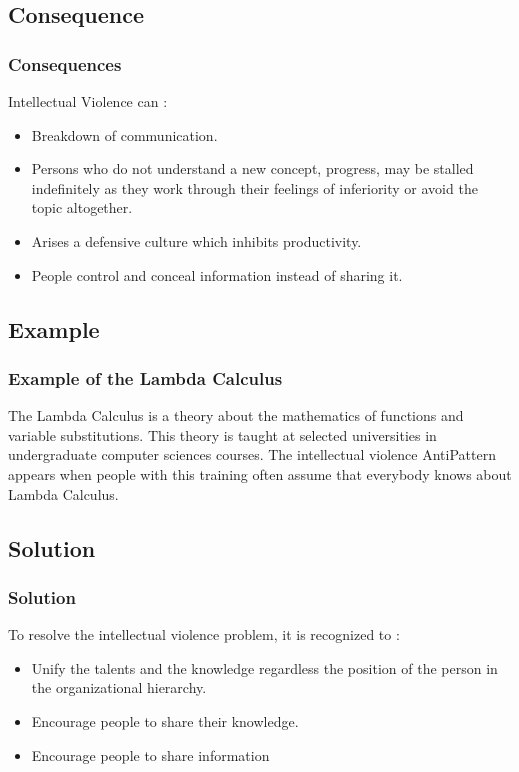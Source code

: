 \documentclass{beamer}
\begin{document}
\subsection{Consequence}
\begin{frame}
\frametitle{Consequences}
Intellectual Violence can :\\
\begin{itemize}
\item  Breakdown of communication.
\item  Persons who do not understand a new concept, progress, may be stalled indefinitely as they work through their feelings of inferiority or avoid the topic altogether.
\item Arises a defensive culture  which inhibits productivity.
\item People control and conceal information instead of sharing it.
\end{itemize}
\end{frame}

\subsection{Example}
\begin{frame}
\frametitle{Example of the Lambda Calculus}
The Lambda Calculus is a theory about the mathematics of functions and variable substitutions. This theory is taught at selected universities in undergraduate computer sciences courses. The intellectual violence AntiPattern  appears when people with this training often assume that everybody knows about Lambda Calculus.
\end{frame}

\subsection{Solution}
\begin{frame}
\frametitle{Solution}
To resolve the intellectual violence problem, it is recognized to :
\begin{itemize}
\item Unify the talents and the knowledge regardless the position of the person in the organizational hierarchy.
\item  Encourage people to share their knowledge.
\item  Encourage people to share information
\end{itemize}
\end{frame}
\end{document}
